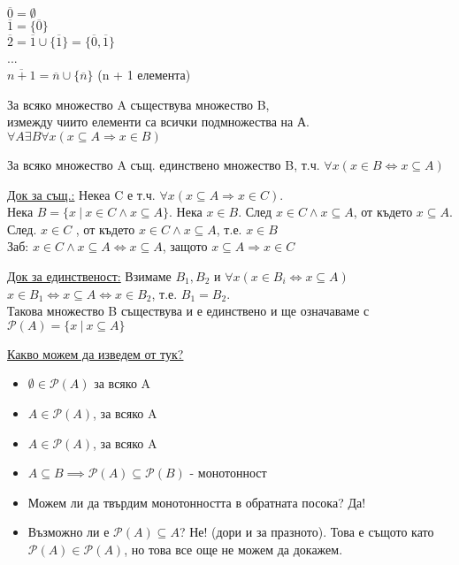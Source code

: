 \documentclass[fleqn, titlepage, 12pt]{report}
\begin{document}
$ \overline{0} = \emptyset $\\
$ \overline{1} = \{ \overline{0}\}$\\
$ \overline{2} = \overline{1} \cup \{ \overline{1}\} = \{ \overline{0}, \overline{1}\}$\\
...\\
$ \overline{n + 1} = \overline{n} \cup \{ \overline{n}\}$ (n + 1 елемента)
\bigbreak

 За всяко множество A съществува множество B,\\
измежду чиито елементи са всички подмножества на А.\\
$ \forall{A} \exists{B} \forall{x} (x \subseteq A \Rightarrow x \in B)$
\bigbreak

 За всяко множество A същ. единствено множество B, т.ч.
$ \forall{x} (x \in B \Leftrightarrow x \subseteq A)$
\bigbreak

\underline{Док за същ.:} Некеа C е т.ч. $ \forall{x} (x \subseteq A \Rightarrow x \in C)$.\\
Нека $ B = \{x\ |\  x \in C \land x \subseteq A\}$. Нека $x \in B$. След $ x \in C \land x \subseteq A$, от където
$x \subseteq A$. След. $x \in C$ , от където $x \in C \land x \subseteq A$, т.е. $x \in B$\\
Заб: $x \in C \land x \subseteq A \Leftrightarrow x \subseteq A$, защото $ x \subseteq A \Rightarrow x \in C$
\bigbreak

\underline{Док за единственост:} Взимаме $B_1, B_2$ и $ \forall{x} (x \in B_i \Leftrightarrow x \subseteq A)$\\
$ x \in B_1 \Leftrightarrow x \subseteq A \Leftrightarrow x \in B_2$, т.е. $B_1 = B_2$.\\
Такова множество B съществува и е единствено и ще означаваме с $ \mathcal{P}(A) = \{x\ |\ x \subseteq A\}$
\bigbreak

\underline{Какво можем да изведем от тук?}
\begin{itemize}
  \item $ \emptyset \in \mathcal{P}(A) $ за всяко A
  \item $ A \in \mathcal{P}(A)$, за всяко A
  \item $ A \in \mathcal{P}(A)$, за всяко A
  \item $ A \subseteq B \implies \mathcal{P}(A) \subseteq \mathcal{P}(B) $ - монотонност
  \item Можем ли да твърдим монотонността в обратната посока? Да!
  \item Възможно ли е $ \mathcal{P}(A) \subseteq A$? Не! (дори и за празното).
    Това е същото като $ \mathcal{P}(A) \in  \mathcal{P}(A)$, но това все още не можем да докажем.
\end{itemize}
\bigbreak
\end{document}
